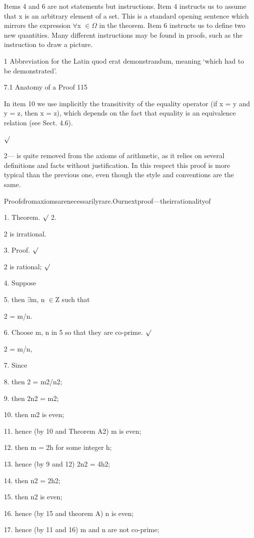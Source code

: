 \documentclass[11pt]{article}
\theoremstyle{plain}
\theoremstyle{definition}
\begin{document}
Items 4 and 6 are not statements but instructions. Item 4 instructs us to assume that x is an arbitrary element of a set. This is a standard opening sentence which mirrors the expression $\forall$x $\in$$\Omega$ in the theorem. Item 6 instructs us to define two new quantities. Many different instructions may be found in proofs, such as the instruction to draw a picture.

1 Abbreviation for the Latin quod erat demonstrandum, meaning `which had to be demonstrated'.

7.1 Anatomy of a Proof 115

In item 10 we use implicitly the transitivity of the equality operator (if x = y and y = z, then x = z), which depends on the fact that equality is an equivalence relation (see Sect. 4.6).

$\surd$

2--- is quite removed from the axioms of arithmetic, as it relies on several definitions and facts without justification. In this respect this proof is more typical than the previous one, even though the style and conventions are the same.

Proofsfromaxiomsarenecessarilyrare.Ournextproof---theirrationalityof

1. Theorem. $\surd$ 2.

2 is irrational.

3. Proof. $\surd$

2 is rational; $\surd$

4. Suppose

5. then $\exists$m, n $\in$Z such that

2 = m/n.

6. Choose m, n in 5 so that they are co-prime. $\surd$

2 = m/n,

7. Since

8. then 2 = m2/n2;

9. then 2n2 = m2;

10. then m2 is even;

11. hence (by 10 and Theorem A2) m is even;

12. then m = 2h for some integer h;

13. hence (by 9 and 12) 2n2 = 4h2;

14. then n2 = 2h2;

15. then n2 is even;

16. hence (by 15 and theorem A) n is even;

17. hence (by 11 and 16) m and n are not co-prime;
\end{document}
